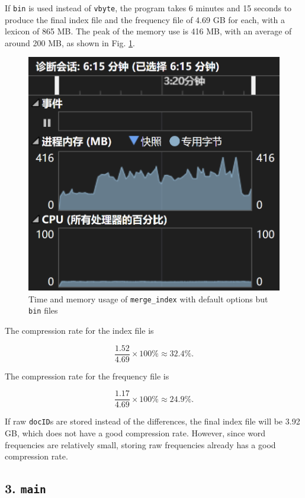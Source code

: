\documentclass[12pt]{article}
\begin{document}
If \texttt{bin} is used instead of \texttt{vbyte}, the program takes 6
minutes and 15 seconds to produce the final index file and the frequency
file of 4.69 GB for each, with a lexicon of 865 MB. The peak of the
memory use is 416 MB, with an average of around 200 MB, as shown in Fig. \ref{merge_bin}.

\begin{figure}[!h]
  \centering
  \includegraphics{readme.assets/merge_bin-1699317091540-8.png}
  \vspace{-4pt}
  \caption{Time and memory usage of \texttt{merge\_index} with default options but \texttt{bin} files}
  \label{merge_bin}
  \vspace{-4pt}
\end{figure}

The compression rate for the index file is

\[\frac{1.52}{4.69} \times 100\% \approx 32.4\%.\]

The compression rate for the frequency file is

\[\frac{1.17}{4.69} \times 100\% \approx 24.9\%.\]

If raw \texttt{docID}s are stored instead of the differences, the final
index file will be 3.92 GB, which does not have a good compression rate.
However, since word frequencies are relatively small, storing raw
frequencies already has a good compression rate.

\hypertarget{3-main-2}{%
\subsection{\texorpdfstring{3.
\texttt{main}}{3. main}}\label{3-main-2}}
\end{document}
